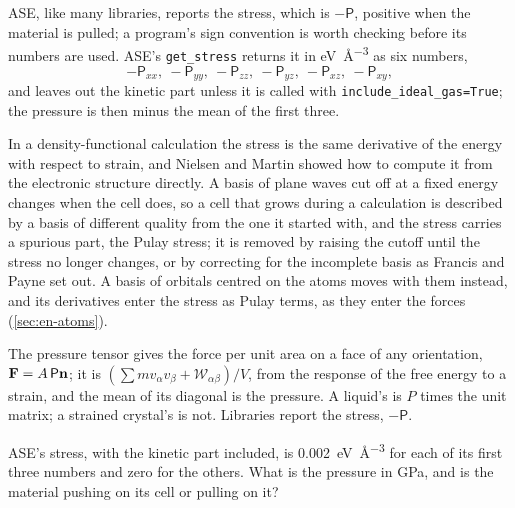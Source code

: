 ASE, like many libraries, reports the stress, which is $-\mathsf{P}$,
positive when the material is pulled; a program's sign convention is
worth checking before its numbers are used. ASE's \texttt{get\_stress}
returns it in \si{\electronvolt\per\angstrom\cubed} as six numbers,
\begin{equation*}
   -\mathsf{P}_{xx},\ -\mathsf{P}_{yy},\ -\mathsf{P}_{zz},\
   -\mathsf{P}_{yz},\ -\mathsf{P}_{xz},\ -\mathsf{P}_{xy} ,
\end{equation*}
and leaves out the kinetic part unless
it is called with \texttt{include\_ideal\_gas=True}; the pressure is then
minus the mean of the first three.

\begin{bridge}
In a density-functional calculation the stress is the same derivative of
the energy with respect to strain, and Nielsen and Martin showed how to
compute it from the electronic structure directly\cite{Nielsen1985}. A
basis of plane waves cut off at a fixed energy changes when the cell
does, so a cell that grows during a calculation is described by a basis
of different quality from the one it started with, and the stress
carries a spurious part, the Pulay stress; it is removed by raising the
cutoff until the stress no longer changes, or by correcting for the
incomplete basis as Francis and Payne set out\cite{Francis1990}. A basis
of orbitals centred on the atoms moves with them instead, and its
derivatives enter the stress as Pulay terms, as they enter the forces
(\cref{sec:en-atoms}).
\end{bridge}

\begin{keyidea}
The pressure tensor gives the force per unit area on a face of any
orientation, $\bm{\mathrm{F}} = A\,\mathsf{P}\bm{\mathrm{n}}$; it is $(\sum m v_\alpha v_\beta
+ \mathcal{W}_{\alpha\beta})/V$, from the response of the free energy to a
strain, and the mean of its diagonal is the pressure. A liquid's is $P$
times the unit matrix; a strained crystal's is not. Libraries report the
stress, $-\mathsf{P}$.
\end{keyidea}


\begin{selfcheck}
ASE's stress, with the kinetic part included, is
\SI{0.002}{\electronvolt\per\angstrom\cubed} for each of its first three
numbers and zero for the others. What is the pressure in GPa, and is the
material pushing on its cell or pulling on it?
\end{selfcheck}
